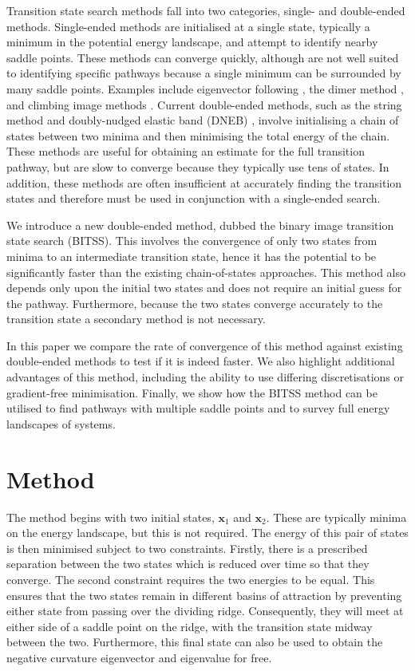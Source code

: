 \documentclass[aps,twocolumn]{revtex4}
\begin{document}
Transition state search methods fall into two categories, single- and double-ended methods.
Single-ended methods are initialised at a single state, typically a minimum in the potential energy landscape, and attempt to identify nearby saddle points. These methods can converge quickly, although are not well suited to identifying specific pathways because a single minimum can be surrounded by many saddle points. Examples include eigenvector following \cite{Cerjan1981}, the dimer method \cite{Heyden2005,Kastner2008}, and climbing image methods \cite{E2007,Ren2013}.
Current double-ended methods, such as the string method \cite{E2002,E2007} and doubly-nudged elastic band (DNEB) \cite{Trygubenko2004}, involve initialising a chain of states between two minima and then minimising the total energy of the chain. These methods are useful for obtaining an estimate for the full transition pathway, but are slow to converge because they typically use tens of states. In addition, these methods are often insufficient at accurately finding the transition states and therefore must be used in conjunction with a single-ended search.

We introduce a new double-ended method, dubbed the binary image transition state search (BITSS). This involves the convergence of only two states from minima to an intermediate transition state, hence it has the potential to be significantly faster than the existing chain-of-states approaches. This method also depends only upon the initial two states and does not require an initial guess for the pathway. Furthermore, because the two states converge accurately to the transition state a secondary method is not necessary.

In this paper we compare the rate of convergence of this method against existing double-ended methods to test if it is indeed faster.
We also highlight additional advantages of this method, including the ability to use differing discretisations or gradient-free minimisation.
Finally, we show how the BITSS method can be utilised to find pathways with multiple saddle points and to survey full energy landscapes of systems.


\section{Method}
The method begins with two initial states, $\bm{x}_1$ and $\bm{x}_2$. These are typically minima on the energy landscape, but this is not required. The energy of this pair of states is then minimised subject to two constraints. Firstly, there is a prescribed separation between the two states which is reduced over time so that they converge. The second constraint requires the two energies to be equal. This ensures that the two states remain in different basins of attraction by preventing either state from passing over the dividing ridge. Consequently, they will meet at either side of a saddle point on the ridge, with the transition state midway between the two. Furthermore, this final state can also be used to obtain the negative curvature eigenvector and eigenvalue for free.
\end{document}

